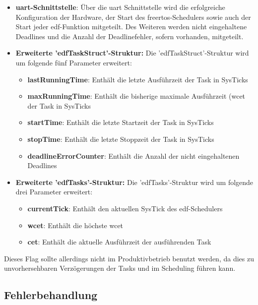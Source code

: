 \documentclass[../EDF Master Thesis.tex]{subfiles}
\begin{document}
    \begin{itemize}
        \item \textbf{\ac{uart}-Schnittstelle}: Über die \ac{uart} Schnittstelle wird die erfolgreiche Konfiguration der Hardware, der Start des \ac{freertos}-Schedulers sowie auch der Start jeder \ac{edf}-Funktion mitgeteilt.
                                                 Des Weiteren werden nicht eingehaltene Deadlines und die Anzahl der Deadlinefehler, sofern vorhanden, mitgeteilt.
        \item \textbf{Erweiterte 'edfTaskStruct'-Struktur:} Die 'edfTaskStruct'-Struktur wird um folgende fünf Parameter erweitert:
        \begin{itemize}
            \item \textbf{lastRunningTime}: Enthält die letzte Ausführzeit der Task in SysTicks
            \item \textbf{maxRunningTime}: Enthält die bisherige maximale Ausführzeit (\ac{wcet} der Task in SysTicks
            \item \textbf{startTime}: Enthält die letzte Startzeit der Task in SysTicks
            \item \textbf{stopTime}: Enthält die letzte Stoppzeit der Task in SysTicks
            \item \textbf{deadlineErrorCounter}: Enthält die Anzahl der nicht eingehaltenen Deadlines
        \end{itemize}
        \item \textbf{Erweiterte 'edfTasks'-Struktur:} Die 'edfTasks'-Struktur wird um folgende drei Parameter erweitert:
        \begin{itemize}
            \item \textbf{currentTick}: Enthält den aktuellen SysTick des \ac{edf}-Schedulers
            \item \textbf{wcet}: Enthält die höchste \ac{wcet}
            \item \textbf{cet}: Enthält die aktuelle Ausführzeit der ausführenden Task
        \end{itemize}
    \end{itemize}

    Dieses Flag sollte allerdings nicht im Produktivbetrieb benutzt werden, da dies zu unvorhersehbaren Verzögerungen der Tasks und im Scheduling führen kann.

\clearpage

\subsection{Fehlerbehandlung} \label{section:Fehlerbehandlung}
\end{document}
